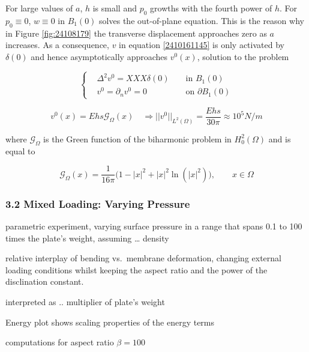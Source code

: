 \documentclass[
  11pt,
]{article}
\begin{document}
For large values of \(a\), \(h\) is small and \(p_0\) growths with the
fourth power of \(h\). For \(p_0 \equiv 0\), \(w \equiv 0\) in
\(B_1(0)\) solves the out-of-plane equation. This is the reason why in
Figure \ref{fig:24108179} the transverse displacement approaches zero as
\(a\) increases. As a consequence, \(v\) in equation \eqref{2410161145}
is only activated by \(\delta(0)\) and hence asymptotically approaches
\(v^0(x)\), solution to the problem

\[
\begin{equation}
\left\{
    \begin{aligned}
        &\Delta^2 v^0 = XXX \delta(0) && \text{ in } B_1(0) \\
        &v^0 = \partial_n v^0 = 0 && \text{ on } \partial B_1(0)
    \end{aligned}
\right.
\end{equation}
\]

\[
\begin{equation}
    v^0(x) = E h s \mathcal{G}_{\Omega}(x) \quad \Rightarrow |\!| v^0 |\!|_{L^2(\Omega)} = \frac{E h s}{30\pi} \approx 10^5 N/m
\end{equation}
\]

where \(\mathcal{G}_{\Omega}\) is the Green function of the biharmonic
problem in \(H^2_0(\Omega)\) and is equal to

\[
\begin{equation}
    \mathcal{G}_{\Omega}(x) = \frac{1}{16\pi} \Big( 1- |x|^2 + |x|^2 \ln (|x|^2) \Big), \qquad x\in \Omega
\end{equation}
\]

\subsubsection{3.2 Mixed Loading: Varying
Pressure}\label{mixed-loading-varying-pressure}

parametric experiment, varying surface pressure in a range that spans
0.1 to 100 times the plate's weight, assuming \ldots{} density

relative interplay of bending vs.~membrane deformation, changing
external loading conditions whilst keeping the aspect ratio and the
power of the disclination constant.

interpreted as .. multiplier of plate's weight

Energy plot shows scaling properties of the energy terms

computations for aspect ratio \(\beta =100\)
\end{document}
